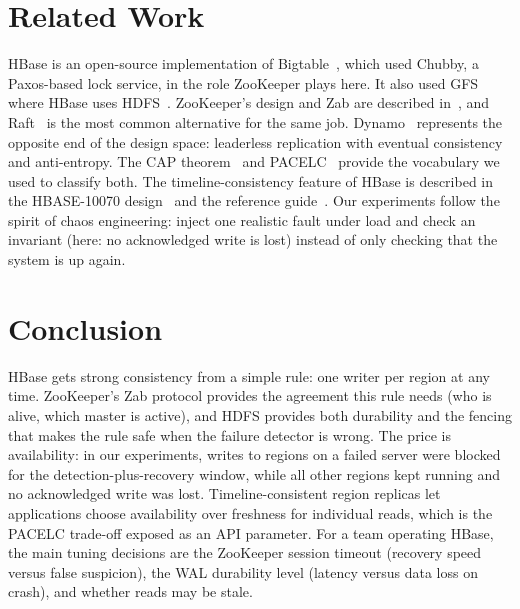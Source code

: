 \documentclass[10pt,twocolumn,letterpaper]{article}
\begin{document}


\section{Related Work}
HBase is an open-source implementation of Bigtable~\cite{bigtable}, which used Chubby, a Paxos-based lock service, in the role ZooKeeper plays here. It also used GFS where HBase uses HDFS~\cite{hdfs}. ZooKeeper's design and Zab are described in~\cite{zookeeper,zab}, and Raft~\cite{raft} is the most common alternative for the same job. Dynamo~\cite{dynamo} represents the opposite end of the design space: leaderless replication with eventual consistency and anti-entropy. The CAP theorem~\cite{cap} and PACELC~\cite{pacelc} provide the vocabulary we used to classify both. The timeline-consistency feature of HBase is described in the HBASE-10070 design~\cite{hbase10070} and the reference guide~\cite{timeline,refguide}. Our experiments follow the spirit of chaos engineering: inject one realistic fault under load and check an invariant (here: no acknowledged write is lost) instead of only checking that the system is up again.

\section{Conclusion}
HBase gets strong consistency from a simple rule: one writer per region at any time. ZooKeeper's Zab protocol provides the agreement this rule needs (who is alive, which master is active), and HDFS provides both durability and the fencing that makes the rule safe when the failure detector is wrong. The price is availability: in our experiments, writes to regions on a failed server were blocked for the detection-plus-recovery window, while all other regions kept running and no acknowledged write was lost. Timeline-consistent region replicas let applications choose availability over freshness for individual reads, which is the PACELC trade-off exposed as an API parameter. For a team operating HBase, the main tuning decisions are the ZooKeeper session timeout (recovery speed versus false suspicion), the WAL durability level (latency versus data loss on crash), and whether reads may be stale.

\appendix
\end{document}
